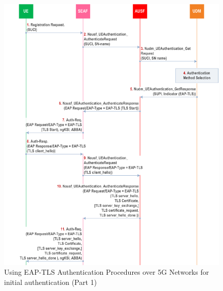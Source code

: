 \begin{figure}
    \centering
    \includegraphics[width=1\linewidth]{figs/Using EAP-TLS Authentication Procedures over 5G Networks for initial authentication_1.png}
    \caption{Using \acs{EAP-TLS} Authentication Procedures over \acs{5G} Networks for initial authentication (Part 1)}
    \label{fig:Using EAP-TLS Authentication Procedures over 5G Networks for initial authentication_1}
\end{figure}

